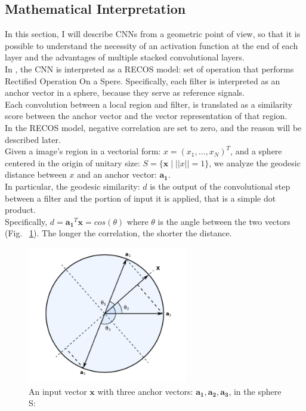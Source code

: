 \documentclass[LaM,binding=0.6cm]{sapthesis}
\begin{document}
\subsection{Mathematical Interpretation}
In this section, I will describe CNNs from a geometric point of view, so that it is possible to understand the necessity of an activation function at the end of each layer and the advantages of multiple stacked convolutional layers.\\In \cite{cnninter}, the CNN is interpreted as a RECOS model: set of operation that performs Rectified Operation On a Spere. Specifically, each filter is interpreted as an anchor vector in a sphere, because they serve as reference signals.\\Each convolution between a local region and filter, is translated as a similarity score between the anchor vector and the vector representation of that region.\\In the RECOS model, negative correlation are set to zero, and the reason will be described later.\\Given a image's region in a vectorial form: $x=(x_1,\dots,x_N)^T$, and a sphere centered in the origin of unitary size: $S=\{\boldsymbol{x}\mid ||x||=1\}$, we analyze the geodesic distance between $x$ and an anchor vector: $\boldsymbol{a_1}$.\\In particular, the geodesic similarity: $d$ is the output of the convolutional step between a filter and the portion of input it is applied, that is a simple dot product.\\Specifically, $d=\boldsymbol{a_1}^T \boldsymbol{x}=cos(\theta)$ where $\theta$ is the angle between the two vectors (Fig. ~\ref{fig:geocnn}). The longer the correlation, the shorter the distance.
\begin{figure}[H]  \centering
	\includegraphics[width=70mm,scale=0.7]{geocnn}
	\caption{An input vector $\boldsymbol{x}$ with three anchor vectors: $\boldsymbol{a_1,a_2,a_3}$, in the sphere S: \cite{cnninter}}
	\label{fig:geocnn}
\end{figure}
\end{document}
